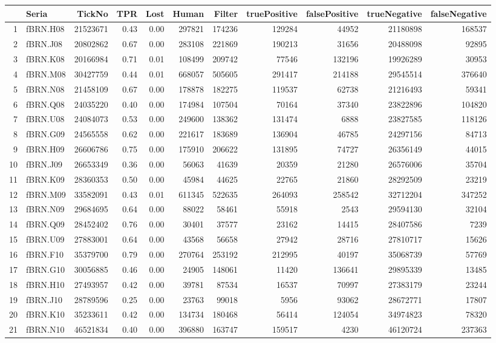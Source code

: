 \documentclass[a4paper,12pt,openany, DIV=calc, headsepline]{scrbook}
\begin{document}
\begin{table}[ht]
\centering
\tiny
\begin{tabular}{rlrrrrrrrrr}
  \hline
 & Seria & TickNo & TPR & Lost & Human & Filter & truePositive & falsePositive & trueNegative & falseNegative \\ 
  \hline
1 & fBRN.H08 & 21523671 & 0.43 & 0.00 & 297821 & 174236 & 129284 & 44952 & 21180898 & 168537 \\ 
  2 & fBRN.J08 & 20802862 & 0.67 & 0.00 & 283108 & 221869 & 190213 & 31656 & 20488098 & 92895 \\ 
  3 & fBRN.K08 & 20166984 & 0.71 & 0.01 & 108499 & 209742 & 77546 & 132196 & 19926289 & 30953 \\ 
  4 & fBRN.M08 & 30427759 & 0.44 & 0.01 & 668057 & 505605 & 291417 & 214188 & 29545514 & 376640 \\ 
  5 & fBRN.N08 & 21458109 & 0.67 & 0.00 & 178878 & 182275 & 119537 & 62738 & 21216493 & 59341 \\ 
  6 & fBRN.Q08 & 24035220 & 0.40 & 0.00 & 174984 & 107504 & 70164 & 37340 & 23822896 & 104820 \\ 
  7 & fBRN.U08 & 24084073 & 0.53 & 0.00 & 249600 & 138362 & 131474 & 6888 & 23827585 & 118126 \\ 
  8 & fBRN.G09 & 24565558 & 0.62 & 0.00 & 221617 & 183689 & 136904 & 46785 & 24297156 & 84713 \\ 
  9 & fBRN.H09 & 26606786 & 0.75 & 0.00 & 175910 & 206622 & 131895 & 74727 & 26356149 & 44015 \\ 
  10 & fBRN.J09 & 26653349 & 0.36 & 0.00 & 56063 & 41639 & 20359 & 21280 & 26576006 & 35704 \\ 
  11 & fBRN.K09 & 28360353 & 0.50 & 0.00 & 45984 & 44625 & 22765 & 21860 & 28292509 & 23219 \\ 
  12 & fBRN.M09 & 33582091 & 0.43 & 0.01 & 611345 & 522635 & 264093 & 258542 & 32712204 & 347252 \\ 
  13 & fBRN.N09 & 29684695 & 0.64 & 0.00 & 88022 & 58461 & 55918 & 2543 & 29594130 & 32104 \\ 
  14 & fBRN.Q09 & 28452402 & 0.76 & 0.00 & 30401 & 37577 & 23162 & 14415 & 28407586 & 7239 \\ 
  15 & fBRN.U09 & 27883001 & 0.64 & 0.00 & 43568 & 56658 & 27942 & 28716 & 27810717 & 15626 \\ 
  16 & fBRN.F10 & 35379700 & 0.79 & 0.00 & 270764 & 253192 & 212995 & 40197 & 35068739 & 57769 \\ 
  17 & fBRN.G10 & 30056885 & 0.46 & 0.00 & 24905 & 148061 & 11420 & 136641 & 29895339 & 13485 \\ 
  18 & fBRN.H10 & 27493957 & 0.42 & 0.00 & 39781 & 87534 & 16537 & 70997 & 27383179 & 23244 \\ 
  19 & fBRN.J10 & 28789596 & 0.25 & 0.00 & 23763 & 99018 & 5956 & 93062 & 28672771 & 17807 \\ 
  20 & fBRN.K10 & 35233611 & 0.42 & 0.00 & 134734 & 180468 & 56414 & 124054 & 34974823 & 78320 \\ 
  21 & fBRN.N10 & 46521834 & 0.40 & 0.00 & 396880 & 163747 & 159517 & 4230 & 46120724 & 237363 \\ 
   \hline
\end{tabular}
\end{table}
\end{document}
